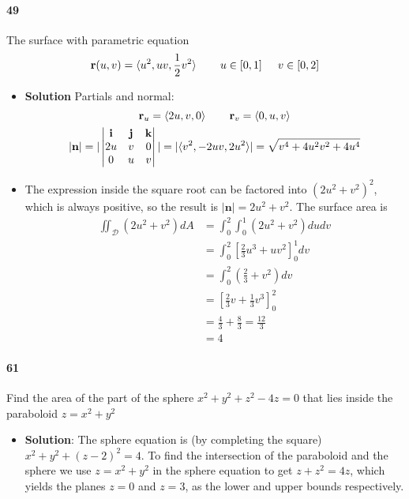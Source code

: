 \documentclass{article}
\begin{document}
    \paragraph{49} The surface with parametric equation
    \[ \mathbf{r}(u,v) = \langle u^2, uv, \frac{1}{2}v^2 \rangle \hspace{0.3in} u \in [0,1] \hspace{.2in} v \in [0,2]  \]
    \begin{itemize}
        \item \textbf{Solution} Partials and normal:
        \begin{gather*}
            \mathbf{r}_u = \langle 2u, v, 0 \rangle \hspace{0.3in} \mathbf{r}_{v} = \langle 0, u, v \rangle \\
             |\mathbf{n}| = |\begin{vmatrix}
                \mathbf{i} & \mathbf{j} & \mathbf{k}\\
                2u & v & 0\\
                0 & u & v\\
            \end{vmatrix}| = |\langle v^2, -2uv, 2u^2 \rangle| = \sqrt{v^4 + 4u^2v^2 + 4u^4} \\
        \end{gather*}
         \item The expression inside the square root can be factored into $(2u^2 + v^2)^2$, which is always positive, so the result is $|\mathbf{n}| = 2u^2+v^2$. The surface area is 
         \begin{align*}
             \iint_{\mathcal{D}} (2u^2+v^2)dA &= \int_0^2 \int_0^1 (2u^2+v^2) dudv \\
             &= \int_0^2 [\frac{2}{3}u^3 +uv^2]_0^1 dv \\
             &= \int_0^2 (\frac{2}{3} + v^2)dv \\
             &= [\frac{2}{3}v + \frac{1}{3}v^3]_0^2 \\
             &= \frac{4}{3} + \frac{8}{3} = \frac{12}{3}\\
             &= 4
         \end{align*}
    \end{itemize}
    
    \paragraph{61} Find the area of the part of the sphere $x^2+y^2+z^2-4z=0$ that lies inside the paraboloid $z=x^2+y^2$
    \begin{itemize}
        \item \textbf{Solution}: The sphere equation is (by completing the square) $x^2 + y^2 + (z-2)^2 =4$. To find the intersection of the paraboloid and the sphere we use $z=x^2+y^2$ in the sphere equation to get $z+z^2=4z$, which yields the planes $z=0$ and $z=3$, as the lower and upper bounds respectively.
    \end{itemize}
    
    
\end{document}

